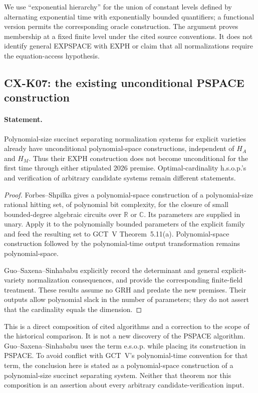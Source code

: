 \documentclass[11pt,a4paper]{article}
\begin{document}
We use ``exponential hierarchy'' for the union of constant levels
defined by alternating exponential time with exponentially bounded
quantifiers; a functional version permits the corresponding oracle
construction. The argument proves membership at a fixed finite level
under the cited source conventions. It does not identify general
EXPSPACE with EXPH or claim that all normalizations require the
equation-access hypothesis.

\subsection{CX-K07: the existing unconditional PSPACE construction}
\label{cx:k07}

\paragraph{Statement.}
Polynomial-size succinct separating normalization systems for explicit
varieties already have unconditional polynomial-space constructions,
independent of $H_A$ and $H_M$. Thus their EXPH construction does not
become unconditional for the first time through either stipulated
2026 premise. Optimal-cardinality h.s.o.p.'s and verification of
arbitrary candidate systems remain different statements.

\begin{proof}
Forbes--Shpilka \cite[Theorem~7.1, preprint p.~21]{FS18} gives a
polynomial-space construction of a polynomial-size rational hitting
set, of polynomial bit complexity, for the closure of small
bounded-degree algebraic circuits over $\mathbb R$ or $\mathbb C$.
Its parameters are supplied in unary. Apply it to the polynomially
bounded parameters of the explicit family and feed the resulting set
to GCT~V Theorem~5.11(a). Polynomial-space construction followed by
the polynomial-time output transformation remains polynomial-space.

Guo--Saxena--Sinhababu \cite[Theorems~1.5 and~1.6, p.~6]{GSS19}
explicitly record the determinant and general explicit-variety
normalization consequences, and provide the corresponding finite-field
treatment. These results assume no GRH and predate the new premises.
Their outputs allow polynomial slack in the number of parameters;
they do not assert that the cardinality equals the dimension.
\end{proof}

This is a direct composition of cited algorithms and a correction to
the scope of the historical comparison. It is not a new discovery of
the PSPACE algorithm. Guo--Saxena--Sinhababu uses the term e.s.o.p.
while placing its construction in PSPACE. To avoid conflict with
GCT~V's polynomial-time convention for that term, the conclusion here
is stated as a polynomial-space construction of a polynomial-size
succinct separating system. Neither that theorem nor this composition
is an assertion about every arbitrary candidate-verification input.
\end{document}
